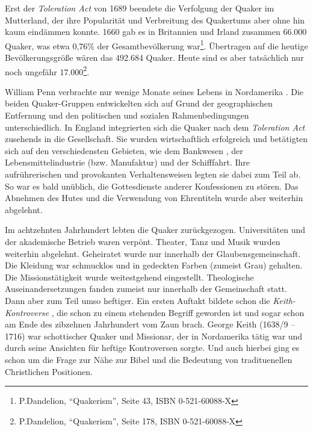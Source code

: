 \medskip

Erst der \textit{Toleration Act}  von 1689 beendete die
Verfolgung der Quaker im
Mutterland, der ihre Popularität und Verbreitung des Quakertums aber ohne hin kaum eindämmen konnte.
  1660 gab
es in Britannien  und Irland 
zusammen
66.000 Quaker, was etwa 0,76\% der
Gesamtbevölkerung war\footnote{P.Dandelion, "`Quakerism"', Seite 43, ISBN
0-521-60088-X}. Übertragen auf die heutige Bevölkerungsgröße wären das 492.684
Quaker. Heute sind es aber tatsächlich nur noch ungefähr
17.000\footnote{P.Dandelion, "`Quakerism"', Seite 178, ISBN 0-521-60088-X}.

\medskip

William Penn verbrachte nur wenige Monate seines Lebens in Nordamerika
. Die beiden
Quaker-Gruppen entwickelten sich auf Grund der geographischen Entfernung und den
politischen und sozialen Rahmenbedingungen unterschiedlich. In
England integrierten sich die Quaker nach dem \textit{Toleration Act} zusehends
in die Gesellschaft. Sie wurden  wirtschaftlich
erfolgreich und betätigten sich
auf den verschiedensten Gebieten, wie dem Bankwesen , der
Lebensmittelindustrie 
(bzw. Manufaktur) und der Schifffahrt. Ihre aufrührerischen und provokanten
Verhaltensweisen legten sie dabei zum Teil ab. So war es bald unüblich, die
Gottesdienste  anderer Konfessionen
 zu stören. Das Abnehmen des Hutes und die
Verwendung von Ehrentiteln wurde aber weiterhin abgelehnt.

\medskip

Im achtzehnten Jahrhundert lebten die Quaker zurückgezogen.
Universitäten  und der akademische Betrieb waren verpönt.
 Theater, Tanz  und Musik 
wurden weiterhin abgelehnt. Geheiratet  wurde nur innerhalb der
Glaubensgemeinschaft. Die Kleidung  war schmucklos und in
gedeckten Farben
(zumeist Grau) gehalten. Die Missionstätigkeit wurde weitestgehend eingestellt.
Theologische Auseinandersetzungen fanden zumeist nur innerhalb der Gemeinschaft
statt. Dann aber zum Teil umso heftiger. Ein ersten Auftakt bildete schon die
\textit{Keith-Kontroverse} , die schon zu einem
stehenden Begriff geworden ist und sogar schon am Ende des zibzehnen Jahrhundert vom Zaun brach. George Keith (1638/9 -- 1716)  war schottischer
Quaker und Missionar, der in
Nordamerika tätig war und durch seine Ansichten für heftige Kontroversen
sorgte. Und auch hierbei ging es schon um die Frage zur Nähe zur Bibel und die Bedeutung von tradituenellen Christlichen Positionen.


